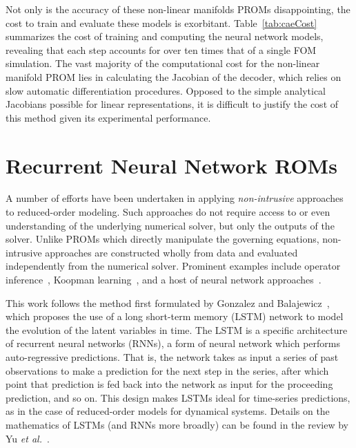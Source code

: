 Not only is the accuracy of these non-linear manifolds PROMs disappointing, the cost to train and evaluate these models is exorbitant. Table~\ref{tab:caeCost} summarizes the cost of training and computing the neural network models, revealing that each step accounts for over ten times that of a single FOM simulation. The vast majority of the computational cost for the non-linear manifold PROM lies in calculating the Jacobian of the decoder, which relies on slow automatic differentiation procedures. Opposed to the simple analytical Jacobians possible for linear representations, it is difficult to justify the cost of this method given its experimental performance.

\section{Recurrent Neural Network ROMs}

A number of efforts have been undertaken in applying \textit{non-intrusive} approaches to reduced-order modeling. Such approaches do not require access to or even understanding of the underlying numerical solver, but only the outputs of the solver. Unlike PROMs which directly manipulate the governing equations, non-intrusive approaches are constructed wholly from data and evaluated independently from the numerical solver. Prominent examples include operator inference~\cite{Peherstorfer2016,Qian2020}, Koopman learning~\cite{Pan2021}, and a host of neural network approaches~\cite{Gonzalez2018,Xu2020,Maulik2020}. 

This work follows the method first formulated by Gonzalez and Balajewicz~\cite{Gonzalez2018}, which proposes the use of a long short-term memory (LSTM) network to model the evolution of the latent variables in time. The LSTM is a specific architecture of recurrent neural networks (RNNs), a form of neural network which performs auto-regressive predictions. That is, the network takes as input a series of past observations to make a prediction for the next step in the series, after which point that prediction is fed back into the network as input for the proceeding prediction, and so on. This design makes LSTMs ideal for time-series predictions, as in the case of reduced-order models for dynamical systems. Details on the mathematics of LSTMs (and RNNs more broadly) can be found in the review by Yu \textit{et al.}~\cite{Yu2019}. 

